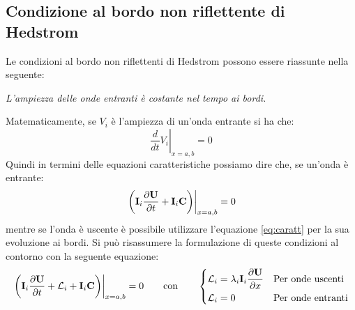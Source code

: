 \subsection{Condizione al bordo non riflettente di Hedstrom}
Le condizioni al bordo non riflettenti di Hedstrom possono essere riassunte nella seguente:
\begin{center}
    \textit{L'ampiezza delle onde entranti è costante nel tempo ai bordi.}
\end{center}
Matematicamente, se $V_i$ è l'ampiezza di un'onda entrante si ha che:
\[
    \left. \frac{d}{dt} V_i\right|_{x = a, b} = 0 
\]
Quindi in termini delle equazioni caratteristiche possiamo dire che, se un'onda è entrante:
\begin{equation}
    \left. \left(\vv{I}_i \pd{ \vv{U}} + \vv{I}_i \vv{C}\right)\right|_{x = a, b} = 0 
\end{equation}
mentre se l'onda è uscente è possibile utilizzare l'equazione \ref{eq:caratt} per la sua evoluzione ai bordi. Si può risassumere la formulazione di queste condizioni al contorno con la seguente equazione:
\begin{equation}
    \left.\left(\vv{I}_i \pd{\vv{U}} + \Lagr_i + \vv{I}_i\vv{C} \right)\right|_{x = a, b}= 0 
	\qquad \mbox{con} \qquad 
    \begin{dcases}
	\Lagr_i = \lambda_i\vv{I}_i \pdx{\vv{U}}{x} & \mbox{Per onde uscenti}\\
	\Lagr_i = 0 & \mbox{Per onde entranti}
    \end{dcases}
    \label{eq:caratt_final}
\end{equation}

